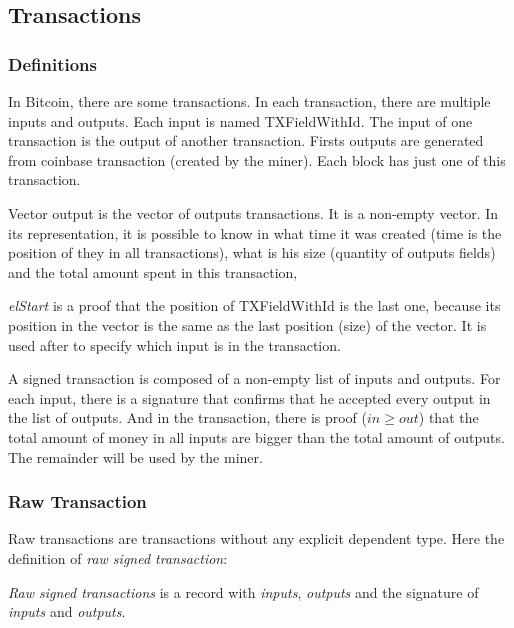 \subsection{Transactions}

\subsubsection{Definitions}

In Bitcoin, there are some transactions.
In each transaction, there are multiple inputs and outputs.
Each input is named TXFieldWithId.
The input of one transaction is the output of another transaction.
Firsts outputs are generated from coinbase transaction (created by the miner).
Each block has just one of this transaction.


Vector output is the vector of outputs transactions.
It is a non-empty vector.
In its representation, it is possible to know in what time it was created (time is the position of
they in all transactions),
what is his size (quantity of outputs fields)
and the total amount spent in this transaction,

\emph{elStart} is a proof that the position of TXFieldWithId is the last one,
because its position in the vector is the same as the last position (size) of the vector.
It is used after to specify which input is in the transaction.


A signed transaction is composed of a non-empty list of inputs and outputs.
For each input, there is a signature that confirms that he accepted every output in the list of outputs.
And in the transaction, there is proof ($in \geq out$) that the total amount of money
in all inputs are bigger than the total amount of outputs.
The remainder will be used by the miner.

\subsubsection{Raw Transaction}

Raw transactions are transactions without any explicit dependent type.
Here the definition of \emph{raw signed transaction}:


\emph{Raw signed transactions} is a record with \emph{inputs}, \emph{outputs}
and the signature of \emph{inputs} and \emph{outputs}.


